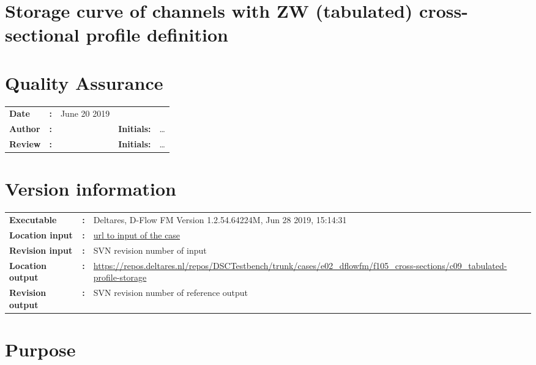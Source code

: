 

\section{Storage curve of channels with ZW (tabulated) cross-sectional profile definition}
\newrefsegment

\section*{Quality Assurance}
\begin{tabular}{@{}p{27mm}@{}p{0mm}p{\textwidth-52mm-48pt}p{15mm}p{10mm}}
\textbf{Date} & \textbf{:} &   June 20 2019\\ 
\textbf{Author} & \textbf{:} &   & \textbf{Initials:} & \ldots \\
\textbf{Review} & \textbf{:} &   & \textbf{Initials:} & \ldots 
\end{tabular}

\section*{Version information}
{{
\begin{tabular}{@{}p{27mm}@{}p{0mm}p{\textwidth-27mm-24pt}}
\textbf{Executable}   & \textbf{:} & Deltares, D-Flow FM Version 1.2.54.64224M, Jun 28 2019, 15:14:31  \\
\textbf{Location input}     & \textbf{:} & \url{url to input of the case} \\
\textbf{Revision input} & \textbf{:} & SVN revision number of input \\
\textbf{Location output}     & \textbf{:} & \url{https://repos.deltares.nl/repos/DSCTestbench/trunk/cases/e02_dflowfm/f105_cross-sections/c09_tabulated-profile-storage} \\
\textbf{Revision output} & \textbf{:} & SVN revision number of reference output
\end{tabular}
}}

\section*{Purpose}


